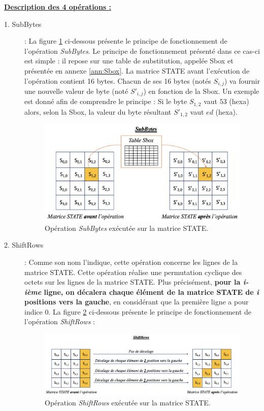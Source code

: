 \documentclass[10pt, oneside, a4paper]{article}
\begin{document}
\underline{\textbf{Description des 4 opérations :}} \\
\begin{description}
\item[1. SubBytes] : 
La figure \ref{fig:SubBytes} ci-dessous présente le principe de fonctionnement de l'opération \textit{SubBytes}. Le principe de fonctionnement présenté dans ce cas-ci est simple : il repose sur une table de substitution, appelée Sbox et présentée en annexe \ref{ann:Sbox}. La matrice STATE avant l'exécution de l'opération contient 16 bytes. Chacun de ses 16 bytes (notés $S_{i,j}$) va fournir une nouvelle valeur de byte (noté $S'_{i,j}$) en fonction de la Sbox. Un exemple est donné afin de comprendre le principe : Si le byte $S_{1,2}$ vaut $53$ (hexa) alors, selon la Sbox, la valeur du byte résultant $S'_{1,2}$ vaut $ed$ (hexa).

\begin{figure}[htbp]
    \centering
    \includegraphics[scale=0.42]{image/SubBytes}
    \caption{Opération \textit{SubBytes} exécutée sur la matrice STATE.}
    \label{fig:SubBytes}
\end{figure}

\item[2. ShiftRows] : Comme son nom l'indique, cette opération concerne les lignes de la matrice STATE. Cette opération réalise une permutation cyclique des octets sur les lignes de la matrice STATE. Plus précisément, \textbf{pour la \textit{i-ième} ligne, on décalera chaque élément de la matrice STATE de \textit{i} positions vers la gauche}, en considérant que la première ligne a pour indice 0.
La figure \ref{fig:ligne} ci-dessous présente le principe de fonctionnement de l'opération \textit{ShiftRows} :
\begin{figure}[htbp]
    \centering
    \includegraphics[scale=0.55]{image/ligne}
    \caption{Opération \textit{ShiftRows} exécutée sur la matrice STATE.}
    \label{fig:ligne}
\end{figure}


\end{description}
\end{document}

